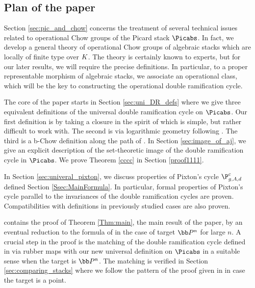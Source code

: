 

\subsection{Plan of the paper}


Section \ref{sec:pic_and_chow}  concerns
 the treatment
of several technical issues related to operational Chow groups
of
the Picard stack $\Picabs$.
In fact,
we develop a general theory of operational Chow groups of algebraic stacks which are
locally of finite type over ${K}$.
The theory is certainly known to experts, but for our later results, we will require
the precise definitions. In particular, to a proper representable morphism of algebraic stacks, we associate an operational class, which will be the key to constructing the operational double ramification cycle.

The core  of the
paper starts in Section \ref{sec:uni_DR_defs} where
we give three equivalent definitions of the universal double ramification cycle on $\Picabs$. Our first definition is by taking a closure in the spirit of \cite{Holmes2017Jacobian-extens}
which is simple, but rather difficult to work with. The second is via logarithmic geometry following \cite{Marcus2017Logarithmic-com}. The third is a  b-Chow definition along the path of
\cite{Holmes2017Multiplicativit}.
In  Section \ref{sec:image_of_aj}, we give an explicit description of the
set-theoretic image of the double ramification cycle in $\Picabs$.
We prove Theorem \ref{cccc} in Section \ref{proof1111}.

In Section \ref{sec:univeral_pixton}, we discuss properties
of Pixton's  cycle $\P_{g,A,d}^{c}$ defined  Section \ref{Ssec:MainFormula}. In particular,
formal properties of Pixton's cycle parallel to the invariances of the double ramification cycles
are proven. Compatibilities with definitions in previously studied
cases are also proven.


 contains the proof of Theorem \ref{Thm:main}, the main
result of the paper, by an eventual
reduction to the formula of \cite{Janda2018Double-ramifica} in the case of target $\bb P^n$ for large $n$.
A crucial step in the proof is the matching of the double ramification cycle defined in \cite{Janda2018Double-ramifica} via rubber maps with
 our new universal definition on $\Picabs$ in a suitable sense when the target is $\bb P^n$.
 The matching is verified in Section \ref{sec:comparing_stacks} where we follow the pattern of the proof given in \cite{Marcus2017Logarithmic-com} in case the target is a point.

